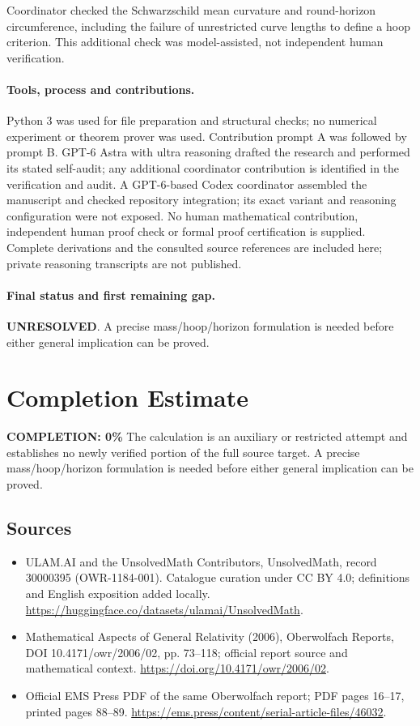 \documentclass[11pt]{article}
\begin{document}
Coordinator checked the Schwarzschild mean curvature and round-horizon circumference, including the failure of unrestricted curve lengths to define a hoop criterion. This additional check was model-assisted, not independent human verification.

\paragraph{Tools, process and contributions.}
Python 3 was used for file preparation and structural checks; no numerical experiment or theorem prover was used. Contribution prompt A was followed by prompt B. GPT-6 Astra with ultra reasoning drafted the research and performed its stated self-audit; any additional coordinator contribution is identified in the verification and audit. A GPT-6-based Codex coordinator assembled the manuscript and checked repository integration; its exact variant and reasoning configuration were not exposed. No human mathematical contribution, independent human proof check or formal proof certification is supplied. Complete derivations and the consulted source references are included here; private reasoning transcripts are not published.

\paragraph{Final status and first remaining gap.}
\textbf{UNRESOLVED}. A precise mass/hoop/horizon formulation is needed before either general implication can be proved.

\section{Completion Estimate}
\noindent\textbf{COMPLETION: 0\%}
The calculation is an auxiliary or restricted attempt and establishes no newly verified portion of the full source target. A precise mass/hoop/horizon formulation is needed before either general implication can be proved.

\subsection{Sources}
\begin{itemize}
\item[\hypertarget{source:30000395:1}{S1}] ULAM.AI and the UnsolvedMath Contributors, UnsolvedMath, record 30000395 (OWR-1184-001). Catalogue curation under CC BY 4.0; definitions and English exposition added locally.
\url{https://huggingface.co/datasets/ulamai/UnsolvedMath}.
\item[\hypertarget{source:30000395:2}{S2}] Mathematical Aspects of General Relativity (2006), Oberwolfach Reports, DOI 10.4171/owr/2006/02, pp. 73--118; official report source and mathematical context.
\url{https://doi.org/10.4171/owr/2006/02}.
\item[\hypertarget{source:30000395:3}{S3}] Official EMS Press PDF of the same Oberwolfach report; PDF pages 16--17, printed pages 88--89.
\url{https://ems.press/content/serial-article-files/46032}.
\end{itemize}
\label{end:30000395}
\end{document}
